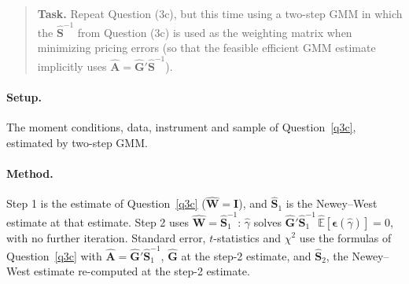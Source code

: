 \documentclass[11pt]{article}
\newcommand{\task}[1]{\begin{quote}\small\textbf{Task.} #1\end{quote}}
\begin{document}
\begin{table}[htbp]
  \centering
  
  \caption{GMM estimate of $\gamma$ from $\widehat{\mathbb{E}}[R_{w,t}^{-\gamma} \cdot xR_{w,t}] = 0$ and
    $\widehat{\mathbb{E}}[R_{w,t}^{-\gamma} \cdot (z_{t-1} \cdot xR_{w,t})] = 0$ with an identity weighting
    matrix ($\hat{\mathbf{A}} = \hat{\mathbf{G}}'$); $z_{t-1}$ as defined in the text. Sample: December 1940
    to December 2021 ($T = 973$ months), identical in versions (1) Common and (2) Max. Data: monthly observations of 12-month (annual) real returns from
    the EQ Dataset. Units: decimals. Standard error next to the estimate and $t$-statistics: Newey--West
    (1987, 1994), Bartlett kernel, Newey--West (1994) automatic lag rounded down (selected lag in the
    table). $\chi^2$: test that the two pricing errors are jointly zero (Moore--Penrose pseudo-inverse).}
  \label{tab:q3c}
\end{table}

\FloatBarrier
\subsection{}\label{q3d}
\task{Repeat Question (3c), but this time using a two-step GMM in which the $\hat{\mathbf{S}}^{-1}$ from Question (3c) is used as the weighting matrix when minimizing pricing errors (so that the feasible efficient GMM estimate implicitly uses $\hat{\mathbf{A}} = \hat{\mathbf{G}}'\hat{\mathbf{S}}^{-1}$).}
\paragraph{Setup.}
The moment conditions, data, instrument and sample of Question~\ref{q3c}, estimated by two-step GMM.

\paragraph{Method.}
Step 1 is the estimate of Question~\ref{q3c} ($\hat{\mathbf{W}} = \mathbf{I}$), and $\hat{\mathbf{S}}_1$ is
the Newey--West estimate at that estimate. Step 2 uses $\hat{\mathbf{W}} = \hat{\mathbf{S}}_1^{-1}$:
$\hat{\gamma}$ solves $\hat{\mathbf{G}}'\hat{\mathbf{S}}_1^{-1}\,\widehat{\mathbb{E}}[\bm{\epsilon}(\hat{\gamma})] = 0$,
with no further iteration. Standard error, $t$-statistics and $\chi^2$ use the formulas of
Question~\ref{q3c} with $\hat{\mathbf{A}} = \hat{\mathbf{G}}'\hat{\mathbf{S}}_1^{-1}$, $\hat{\mathbf{G}}$ at
the step-2 estimate, and $\hat{\mathbf{S}}_2$, the Newey--West estimate re-computed at the step-2 estimate.
\end{document}
